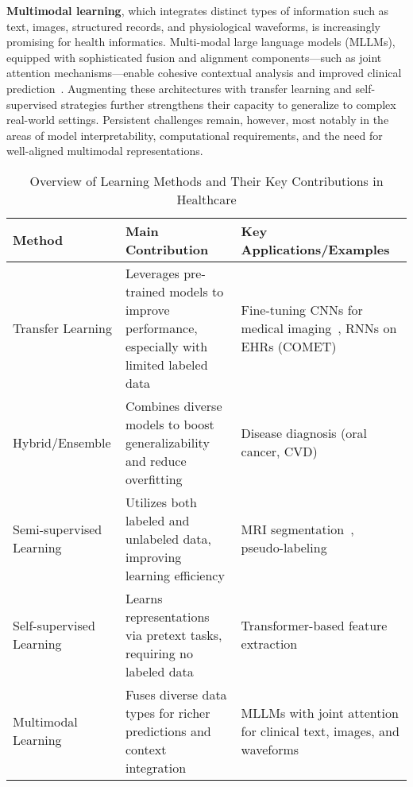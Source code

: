 \documentclass[sigconf]{acmart}
\begin{document}
\textbf{Multimodal learning}, which integrates distinct types of information such as text, images, structured records, and physiological waveforms, is increasingly promising for health informatics. Multi-modal large language models (MLLMs), equipped with sophisticated fusion and alignment components—such as joint attention mechanisms—enable cohesive contextual analysis and improved clinical prediction~\cite{ref31, ref43, ref49, ref50, ref54, ref61, ref65, ref76, ref88, ref90, ref106}. Augmenting these architectures with transfer learning and self-supervised strategies further strengthens their capacity to generalize to complex real-world settings. Persistent challenges remain, however, most notably in the areas of model interpretability, computational requirements, and the need for well-aligned multimodal representations.

\begin{table*}[htbp]
\centering
\caption{Overview of Learning Methods and Their Key Contributions in Healthcare}
\label{tab:learning_methods}
\begin{adjustbox}{max width=\textwidth}
\begin{tabular}{lll}
\toprule
\textbf{Method}      & \textbf{Main Contribution}                                        & \textbf{Key Applications/Examples} \\
\midrule
Transfer Learning    & Leverages pre-trained models to improve performance, especially with limited labeled data & Fine-tuning CNNs for medical imaging~\cite{ref31, ref54, ref90}, RNNs on EHRs (COMET)~\cite{ref49} \\
Hybrid/Ensemble      & Combines diverse models to boost generalizability and reduce overfitting                   & Disease diagnosis (oral cancer, CVD)~\cite{ref53, ref71, ref90} \\
Semi-supervised Learning & Utilizes both labeled and unlabeled data, improving learning efficiency                  & MRI segmentation~\cite{ref61, ref77}, pseudo-labeling~\cite{ref76} \\
Self-supervised Learning & Learns representations via pretext tasks, requiring no labeled data                     & Transformer-based feature extraction~\cite{ref41, ref55, ref106} \\
Multimodal Learning  & Fuses diverse data types for richer predictions and context integration                     & MLLMs with joint attention for clinical text, images, and waveforms~\cite{ref31, ref49, ref76, ref106} \\
\bottomrule
\end{tabular}
\end{adjustbox}
\end{table*}
\end{document}
